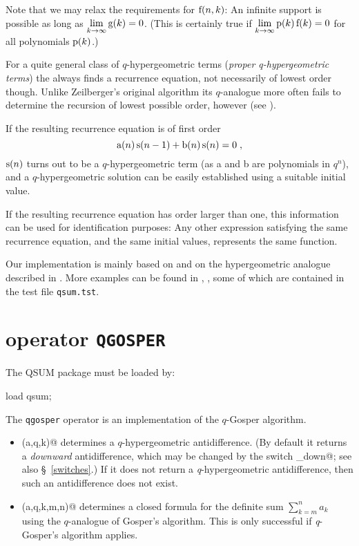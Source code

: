 Note that we may relax the requirements for ${\mathrm f}(n,k)$:
An infinite support is possible as long as 
$\lim\limits_{k\rightarrow\infty}{{\mathrm g}(k)}=0$. 
(This is certainly true if 
$\lim\limits_{k\rightarrow\infty}{{\mathrm p}(k)\,{\mathrm f}(k)}=0$ for
all polynomials ${\mathrm p}(k)$.)

For a quite general class of $q$-hypergeometric terms 
({\sl proper q-hypergeometric terms}) the \qzeilalg
always finds a recurrence equation, not necessarily of lowest
order though. Unlike Zeilberger's original algorithm its
$q$-analogue more often fails to determine the recursion of
lowest possible order, however (see \cite{Paule1}).

If the resulting recurrence equation is of first order
\[
	{\mathrm a}(n)\,{\mathrm s}(n-1)+{\mathrm b}(n)\,{\mathrm s}(n)=0
\;,
\]
${\mathrm s}(n)$ turns out to be a $q$-hypergeometric term
(as a and b are polynomials in $q^n$),
and a $q$-hypergeometric solution can be easily established using a 
suitable initial value.

If the resulting recurrence equation has order larger than one, 
this information can be used for identification purposes:
Any other expression satisfying the same recurrence equation, and the same
initial values, represents the same function.

Our implementation is mainly based on \cite{Koornwinder} and on the
hypergeometric analogue described in \cite{Koepf1}. 
More examples can be found in \cite{GasperRahman}, \cite{Gasper},
some of which are contained in the test file 
{\tt qsum.tst}.


\section{\REDUCE{} operator {\tt QGOSPER}}
\label{reduce_qgosper}

The QSUM package must be loaded by:

\begin{redoutput}
\redprompt load qsum;
\end{redoutput}
The {\tt qgosper} operator is an implementation of the $q$-Gosper
algorithm.
\begin{itemize}
	\item {\verb@qgosper(a,q,k)@} determines a $q$-hypergeometric
		antidifference. (By default it returns a {\sl downward}
		antidifference, which may be changed by the switch 
		{\verb@qgosper_down@}; see also 
		\S~\ref{switches}.)
		If it does not return a \textsl{q}-hypergeometric antidifference,
		then such an antidifference does not exist.
	\item {\verb@qgosper(a,q,k,m,n)@} determines a closed formula
		for the definite sum $\sum\limits_{k=m}^n a_k$ using the
		$q$-analogue of Gosper's algorithm. 
		This is only successful if \textsl{q}-Gosper's algorithm applies.
\end{itemize}

